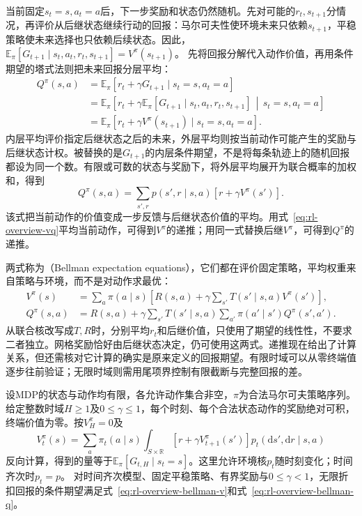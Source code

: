 当前固定$s_t=s,a_t=a$后，下一步奖励和状态仍然随机。先对可能的$r_t,s_{t+1}$分情况，再评价从后继状态继续行动的回报：马尔可夫性使环境未来只依赖$s_{t+1}$，平稳策略使未来选择也只依赖后续状态。因此，
$\mathbb E_\pi[G_{t+1}\mid s_t,a_t,r_t,s_{t+1}]=V^\pi(s_{t+1})$。
先将回报分解代入动作价值，再用条件期望的塔式法则把未来回报分层平均：
\[
\begin{aligned}
 Q^\pi(s,a)
 &=\mathbb E_\pi[r_t+\gamma G_{t+1}\mid s_t=s,a_t=a]\\
 &=\mathbb E_\pi\!\left[
 r_t+\gamma\mathbb E_\pi[G_{t+1}\mid
 s_t,a_t,r_t,s_{t+1}]
 \,\middle|\,s_t=s,a_t=a\right]\\
 &=\mathbb E_\pi[r_t+\gamma V^\pi(s_{t+1})
                 \mid s_t=s,a_t=a].
\end{aligned}
\]
内层平均评价指定后继状态之后的未来，外层平均则按当前动作可能产生的奖励与后继状态计权。被替换的是$G_{t+1}$的内层条件期望，不是将每条轨迹上的随机回报都设为同一个数。有限或可数的状态与奖励下，将外层平均展开为联合概率的加权和，得到
\begin{equation}
  Q^\pi(s,a)=\sum_{s',r}p(s',r\mid s,a)
                         [r+\gamma V^\pi(s')].
  \label{eq:rl-overview-bellman-qv}
\end{equation}
该式把当前动作的价值变成一步反馈与后继状态价值的平均。用式~\eqref{eq:rl-overview-vq}平均当前动作，可得到$V^\pi$的递推；用同一式替换后继$V^\pi$，可得到$Q^\pi$的递推。

两式称为（Bellman expectation equations），它们都在评价固定策略，平均权重来自策略与环境，而不是对动作求最优：
\begin{align}
 V^\pi(s)
  &=\sum_a\pi(a\mid s)
        \left[R(s,a)+\gamma\sum_{s'}T(s'\mid s,a)V^\pi(s')\right],
        \label{eq:rl-overview-bellman-v}\\
 Q^\pi(s,a)
  &=R(s,a)+\gamma\sum_{s'}T(s'\mid s,a)
          \sum_{a'}\pi(a'\mid s')Q^\pi(s',a').
        \label{eq:rl-overview-bellman-q}
\end{align}
从联合核改写成$T,R$时，分别平均$r_t$和后继价值，只使用了期望的线性性，不要求二者独立。网格奖励恰好由后继状态决定，仍可使用这两式。递推现在给出了计算关系，但还需核对它计算的确实是原来定义的回报期望。有限时域可以从零终端值逐步往前验证；无限时域则需用尾项界控制有限截断与完整回报的差。

\begin{theorem}[回报期望与递推一致]
  \label{thm:rl-overview-recursion}
  设MDP的状态与动作均有限，各允许动作集合非空，$\pi$为合法马尔可夫策略序列。给定整数时域$H\geq1$及$0\leq\gamma\leq1$，每个时刻、每个合法状态动作的奖励绝对可积，终端价值为零。按$V_H^\pi=0$及
  \begin{equation}
    V_t^\pi(s)=\sum_a\pi_t(a\mid s)
      \int_{S\times\mathbb R}
      [r+\gamma V_{t+1}^\pi(s')]
      p_t(\mathrm d s',\mathrm d r\mid s,a)
    \label{eq:rl-overview-finite-recursion}
  \end{equation}
  反向计算，得到的量等于$\mathbb E_\pi[G_{t,H}\mid s_t=s]$。这里允许环境核$p_t$随时刻变化；时间齐次时$p_t=p$。
  对时间齐次模型、固定平稳策略、有界奖励与$0\leq\gamma<1$，无限折扣回报的条件期望满足式~\eqref{eq:rl-overview-bellman-v}和式~\eqref{eq:rl-overview-bellman-q}。
\end{theorem}

